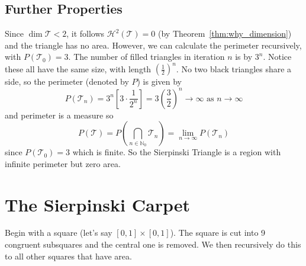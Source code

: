 \documentclass{article}
\theoremstyle{plain}
\theoremstyle{definition}
\theoremstyle{remark}
\begin{document}
\subsection{Further Properties}
Since $\dim \mathcal{T} <2$, it follows $\mathcal{H}^2(\mathcal{T}) = 0$ (by Theorem~\ref{thm:why_dimension}) and the triangle has no area. However, we can calculate the perimeter recursively, with $P(\mathcal{T}_0) = 3$. The number of filled triangles in iteration $n$ is by $3^n$. Notice these all have the same size, with length $(\frac{1}{2})^n$. No two black triangles share a side, so the perimeter (denoted by $P$) is given by \[
P(\mathcal{T}_n) = 3^n \left[3 \cdot \frac{1}{2^n} \right ] = 3 \left ( \frac{3}{2}\right )^n \to \infty \text{ as } n \to \infty
\]
and perimeter is a measure so \[
P(\mathcal{T}) = P \left ( \bigcap \limits _{n \in \mathbb{N}_0} \mathcal{T}_n\right) = \lim \limits _{n \to \infty} P(\mathcal{T}_n)
\]
since $P(\mathcal{T}_0) = 3$ which is finite.
So the Sierpinski Triangle is a region with infinite perimeter but zero area.


\newpage

\section{The Sierpinski Carpet}
Begin with a square (let's say $[0,1] \times [0,1]$). The square is cut into 9 congruent subsquares and the central one is removed. We then recursively do this to all other squares that have area.
\end{document}
